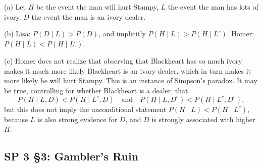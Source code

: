 \documentclass[11pt]{article}
\begin{document}
(a) Let $H$ be the event the man will hurt Stampy, $L$ the event the man has lots of ivory, $D$ the event the man is an ivory dealer.

(b) Lisa: $P(D\mid L) > P(D)$, and implicitly $P(H\mid L) > P(H\mid L^c)$. Homer: $P(H\mid L) < P(H\mid L^c)$.

(c) Homer does not realize that observing that Blackheart has so much ivory makes it much more likely Blackheart is an ivory dealer, which in turn makes it more likely he will hurt Stampy. This is an instance of Simpson's paradox. It may be true, controlling for whether Blackheart is a dealer, that
\[
P(H\mid L,D) < P(H\mid L^c,D) \quad\text{and}\quad P(H\mid L,D^c) < P(H\mid L^c,D^c),
\]
but this does not imply the unconditional statement $P(H\mid L) < P(H\mid L^c)$, because $L$ is also strong evidence for $D$, and $D$ is strongly associated with higher $H$.

\subsection{SP 3 \S3: Gambler's Ruin}
\end{document}
